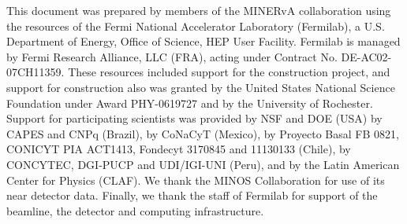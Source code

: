 \begin{acknowledgments}

This document was prepared by members of the MINERvA collaboration using the resources of the Fermi National Accelerator
Laboratory (Fermilab), a U.S. Department of Energy, Office of Science, HEP User Facility.  Fermilab is managed by Fermi
Research Alliance, LLC (FRA), acting under Contract No. DE-AC02-07CH11359.  These resources included support for the \minerva
construction project, and support for construction also was granted by the United States National Science Foundation under
Award PHY-0619727 and by the University of Rochester.  Support for participating scientists was provided by NSF and DOE (USA) by CAPES
and CNPq (Brazil), by CoNaCyT (Mexico), by Proyecto Basal FB 0821, CONICYT PIA ACT1413, Fondecyt 3170845 and 11130133 (Chile),
by CONCYTEC, DGI-PUCP and UDI/IGI-UNI (Peru), and by the Latin American Center for Physics (CLAF).  We thank the MINOS Collaboration
for use of its near detector data. Finally, we thank the staff of Fermilab for support of the beamline, the detector and computing infrastructure.
%
%
%
%
%
%
%
%
%
%
%
\end{acknowledgments}
